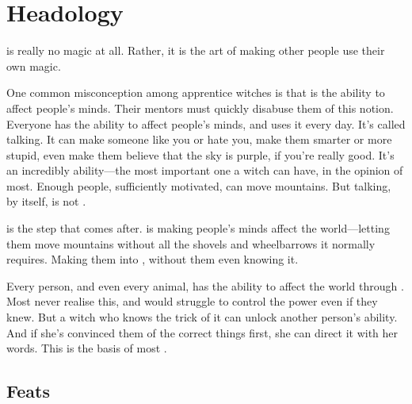 \chapter{Headology}

 is really no magic at all.
Rather, it is the art of making other people use their own magic.

One common misconception among apprentice witches is that  is the ability to affect people's minds.
Their mentors must quickly disabuse them of this notion.
Everyone has the ability to affect people's minds, and uses it every day.
It's called talking.
It can make someone like you or hate you, make them smarter or more stupid, even make them believe that the sky is purple, if you're really good.
It's an incredibly ability---the most important one a witch can have, in the opinion of most.
Enough people, sufficiently motivated, can move mountains.
But talking, by itself, is not .

 is the step that comes after.
 is making people's minds affect the world---letting them move mountains without all the shovels and wheelbarrows it normally requires.
Making them into , without them even knowing it.

Every person, and even every animal, has the ability to affect the world through .
Most never realise this, and would struggle to control the power even if they knew.
But a witch who knows the trick of it can unlock another person's ability.
And if she's convinced them of the correct things first, she can direct it with her words.
This is the basis of most .


\section{Feats}


